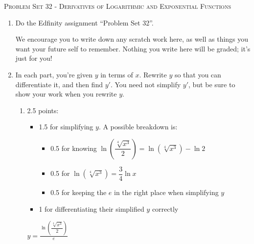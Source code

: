 \documentclass{article}
\newcommand{\doedfinity}[2][\newpage]{
  \begin{problem}[#1]
    Do the Edfinity assignment ``Problem Set #2''.

    We encourage you to write down any scratch work here, as well as
    things you want your future self to remember. Nothing you write
    here will be graded; it's just for you!
  \end{problem}
}
\begin{document}
\begin{center}
  \large\textsc{Problem Set 32 - Derivatives of Logarithmic and Exponential Functions}
\end{center}

\begin{enumerate}
\item  {}

  \doedfinity{32}

\item  In each part, you're given $y$ in terms of $x$. Rewrite $y$ so that you can differentiate it, and then find $y'$. You need not simplify $y'$, but be sure to show your work when you rewrite $y$.

  \begin{enumerate}
  \item

    \begin{grading}
      2.5 points:
      \begin{itemize}[nosep]
      \item 1.5 for simplifying $y$. A possible breakdown is:
        \begin{itemize}[nosep]
        \item 0.5 for knowing $\ln \left( \dfrac{\sqrt[4]{x^3}}{2} \right) = \ln \left( \sqrt[4]{x^3} \right) - \ln 2$
        \item 0.5 for $\ln \left( \sqrt[4]{x^3} \right) = \dfrac{3}{4} \ln x$
        \item 0.5 for keeping the $e$ in the right place when simplifying $y$
        \end{itemize}
      \item 1 for differentiating their simplified $y$ correctly
      \end{itemize}
    \end{grading}

    \begin{problem}[\vfill]
      $\displaystyle y = \frac{\ln \left( \dfrac{\sqrt[4]{x^3}}{2} \right)}{e}$
    \end{problem}


\end{enumerate}
\end{enumerate}
\end{document}
